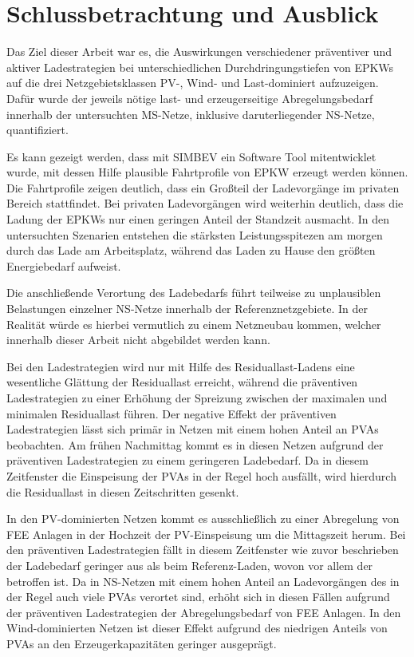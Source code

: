 \section{Schlussbetrachtung und Ausblick}\label{chap:schlussbetrachtung}

Das Ziel dieser Arbeit war es, die Auswirkungen verschiedener präventiver und aktiver Ladestrategien bei unterschiedlichen Durchdringungstiefen von \glspl{EPKW} auf die drei Netzgebietsklassen \gls{PV}-, Wind- und Last-dominiert aufzuzeigen.
Dafür wurde der jeweils nötige last- und erzeugerseitige Abregelungsbedarf innerhalb der untersuchten \gls{MS}-Netze, inklusive daruterliegender \gls{NS}-Netze, quantifiziert.\medskip

Es kann gezeigt werden, dass mit \gls{SIMBEV} ein Software Tool mitentwicklet wurde, mit dessen Hilfe plausible Fahrtprofile von \gls{EPKW} erzeugt werden können.
Die Fahrtprofile zeigen deutlich, dass ein Großteil der Ladevorgänge im privaten Bereich stattfindet.
Bei privaten Ladevorgängen wird weiterhin deutlich, dass die Ladung der \glspl{EPKW} nur einen geringen Anteil der Standzeit ausmacht.
In den untersuchten Szenarien entstehen die stärksten Leistungsspitezen am morgen durch das Lade am Arbeitsplatz, während das Laden zu Hause den größten Energiebedarf aufweist.

Die anschließende Verortung des Ladebedarfs führt teilweise zu unplausiblen Belastungen einzelner \gls{NS}-Netze innerhalb der Referenznetzgebiete.
In der Realität würde es hierbei vermutlich zu einem Netzneubau kommen, welcher innerhalb dieser Arbeit nicht abgebildet werden kann.\medskip

Bei den Ladestrategien wird nur mit Hilfe des Residuallast-Ladens eine wesentliche Glättung der Residuallast erreicht, während die präventiven Ladestrategien zu einer Erhöhung der Spreizung zwischen der maximalen und minimalen Residuallast führen.
Der negative Effekt der präventiven Ladestrategien lässt sich primär in Netzen mit einem hohen Anteil an \glspl{PVA} beobachten.
Am frühen Nachmittag kommt es in diesen Netzen aufgrund der präventiven Ladestrategien zu einem geringeren Ladebedarf.
Da in diesem Zeitfenster die Einspeisung der \glspl{PVA} in der Regel hoch ausfällt, wird hierdurch die Residuallast in diesen Zeitschritten gesenkt.\medskip

In den \gls{PV}-dominierten Netzen kommt es ausschließlich zu einer Abregelung von \gls{FEE} Anlagen in der Hochzeit der \gls{PV}-Einspeisung um die Mittagszeit herum.
Bei den präventiven Ladestrategien fällt in diesem Zeitfenster wie zuvor beschrieben der Ladebedarf geringer aus als beim Referenz-Laden, wovon vor allem der \UC \zH betroffen ist.
Da in \gls{NS}-Netzen mit einem hohen Anteil an Ladevorgängen des \UC \zH in der Regel auch viele \glspl{PVA} verortet sind, erhöht sich in diesen Fällen aufgrund der präventiven Ladestrategien der Abregelungsbedarf von \gls{FEE} Anlagen.
In den Wind-dominierten Netzen ist dieser Effekt aufgrund des niedrigen Anteils von \glspl{PVA} an den Erzeugerkapazitäten geringer ausgeprägt.\medskip

